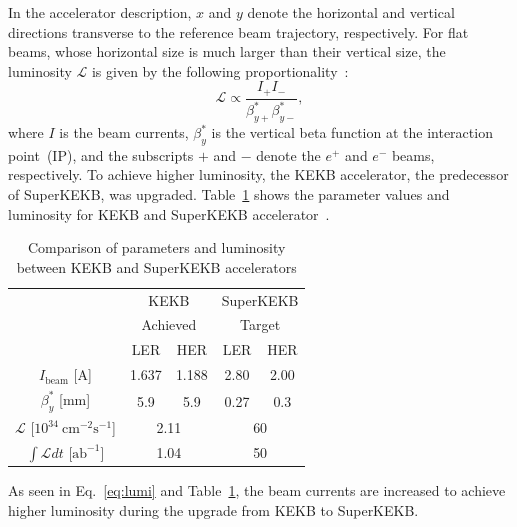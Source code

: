 In the accelerator description, $x$ and $y$ denote the horizontal and vertical directions transverse to the reference beam trajectory, respectively.
For flat beams, whose horizontal size is much larger than their vertical size, the luminosity $\mathcal{L}$ is given by the following proportionality~\cite{Zhou_2024}:
\begin{equation}
  \label{eq:lumi}
  \mathcal{L} \propto \frac{I_{+}I_{-}}{\beta^{*}_{y+}\beta^{*}_{y-}},
\end{equation}
where $I$ is the beam currents, $\beta^{*}_{y}$ is the vertical beta function at the interaction point~(IP), and the subscripts $+$ and $-$ denote the $e^{+}$ and $e^{-}$ beams, respectively.
To achieve higher luminosity, the KEKB accelerator, the predecessor of SuperKEKB, was upgraded.
Table~\ref{tab:accelerator_params} shows the parameter values and luminosity for KEKB and SuperKEKB accelerator~\cite{Zhou_2024,Natochii:2023thp}.
\begin{table}
\caption{Comparison of parameters and luminosity between KEKB and SuperKEKB accelerators}
    \centering
    \begin{tabular}{ p{3cm} p{5cm} p{5cm} p{5cm} p{5cm}  }
    \hline
    \multicolumn{1}{c}{} &  \multicolumn{2}{c}{KEKB} & \multicolumn{2}{c}{SuperKEKB} \\
    \multicolumn{1}{c}{} &  \multicolumn{2}{c}{Achieved} & \multicolumn{2}{c}{Target} \\
    \hline
    \multicolumn{1}{c}{} &  \multicolumn{1}{c}{LER} & \multicolumn{1}{c}{HER} & \multicolumn{1}{c}{LER} & \multicolumn{1}{c}{HER} \\
    \hline
    \multicolumn{1}{c}{$I_{\textrm{beam}}$ [A]} & \multicolumn{1}{c}{1.637} & \multicolumn{1}{c}{1.188} & \multicolumn{1}{c}{2.80} & \multicolumn{1}{c}{2.00} \\
    \multicolumn{1}{c}{$\beta^{*}_{y}$ [mm]} & \multicolumn{1}{c}{5.9} & \multicolumn{1}{c}{5.9} & \multicolumn{1}{c}{0.27} & \multicolumn{1}{c}{0.3} \\
    \multicolumn{1}{c}{$\mathcal{L}$ [$10^{34}~\textrm{cm}^{-2}\textrm{s}^{-1}$]} & \multicolumn{2}{c}{2.11} & \multicolumn{2}{c}{60} \\
    \multicolumn{1}{c}{$\int \mathcal{L} dt$ [$\textrm{ab}^{-1}$]} & \multicolumn{2}{c}{1.04} & \multicolumn{2}{c}{50} \\
  \hline
\end{tabular}
    \label{tab:accelerator_params}
\end{table}
As seen in Eq.~\ref{eq:lumi} and Table~\ref{tab:accelerator_params}, the beam currents are increased to achieve higher luminosity during the upgrade from KEKB to SuperKEKB.
